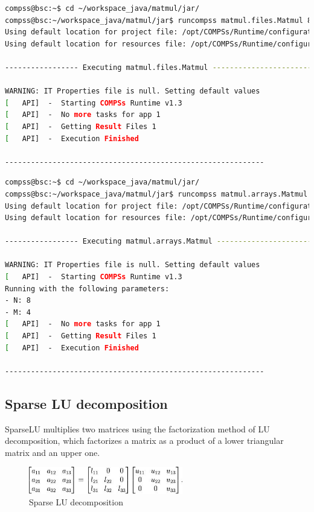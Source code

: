 \begin{lstlisting}[language=bash]
compss@bsc:~$ cd ~/workspace_java/matmul/jar/
compss@bsc:~/workspace_java/matmul/jar$ runcompss matmul.files.Matmul 8 4
Using default location for project file: /opt/COMPSs/Runtime/configuration/xml/projects/project.xml
Using default location for resources file: /opt/COMPSs/Runtime/configuration/xml/resources/resources.xml

----------------- Executing matmul.files.Matmul --------------------------

WARNING: IT Properties file is null. Setting default values
[   API]  -  Starting COMPSs Runtime v1.3
[   API]  -  No more tasks for app 1
[   API]  -  Getting Result Files 1
[   API]  -  Execution Finished

------------------------------------------------------------
\end{lstlisting}


\begin{lstlisting}[language=bash]
compss@bsc:~$ cd ~/workspace_java/matmul/jar/
compss@bsc:~/workspace_java/matmul/jar$ runcompss matmul.arrays.Matmul 8 4
Using default location for project file: /opt/COMPSs/Runtime/configuration/xml/projects/project.xml
Using default location for resources file: /opt/COMPSs/Runtime/configuration/xml/resources/resources.xml

----------------- Executing matmul.arrays.Matmul --------------------------

WARNING: IT Properties file is null. Setting default values
[   API]  -  Starting COMPSs Runtime v1.3
Running with the following parameters:
- N: 8
- M: 4
[   API]  -  No more tasks for app 1
[   API]  -  Getting Result Files 1
[   API]  -  Execution Finished

------------------------------------------------------------
\end{lstlisting}


\subsection{Sparse LU decomposition}
SparseLU multiplies two matrices using the factorization method of LU decomposition, which factorizes a 
matrix as a product of a lower triangular matrix and an upper one.

\begin{figure}[ht!]
  \centering
    \includegraphics[width=0.6\textwidth]{./Sections/2_Java/Figures/SparseLU.jpeg}
    \caption{Sparse LU decomposition}
    \label{fig:SparseLO}
\end{figure}

